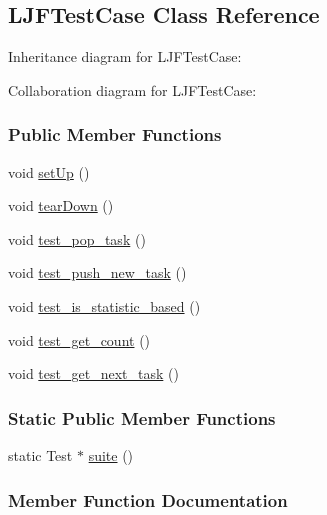 \hypertarget{a00025}{}\subsection{L\+J\+F\+Test\+Case Class Reference}
\label{a00025}


Inheritance diagram for L\+J\+F\+Test\+Case\+:


Collaboration diagram for L\+J\+F\+Test\+Case\+:
\subsubsection*{Public Member Functions}
\begin{DoxyCompactItemize}
\item 
void \hyperlink{a00025_ab3b5deb3ab468b271d65041c3ba418eb}{set\+Up} ()
\item 
void \hyperlink{a00025_a47f0772df53a900d6870f970625f6d7a}{tear\+Down} ()
\item 
void \hyperlink{a00025_a541d3c9f1e4ecbd03e4f777edf4a9a13}{test\+\_\+pop\+\_\+task} ()
\item 
void \hyperlink{a00025_a381a8c163616c0752ce59ca44aff5849}{test\+\_\+push\+\_\+new\+\_\+task} ()
\item 
void \hyperlink{a00025_a81f6f3b146f1d10b687dc647d4398987}{test\+\_\+is\+\_\+statistic\+\_\+based} ()
\item 
void \hyperlink{a00025_aad808d4d522ec3ad9b1ab33abad16f24}{test\+\_\+get\+\_\+count} ()
\item 
void \hyperlink{a00025_a429f7b9280917c4ffd3cf898d7d804c1}{test\+\_\+get\+\_\+next\+\_\+task} ()
\end{DoxyCompactItemize}
\subsubsection*{Static Public Member Functions}
\begin{DoxyCompactItemize}
\item 
static Test $\ast$ \hyperlink{a00025_a1f51591cecf2427561abd7efda1f56ab}{suite} ()
\end{DoxyCompactItemize}


\subsubsection{Member Function Documentation}
\hypertarget{a00025_ab3b5deb3ab468b271d65041c3ba418eb}{}
